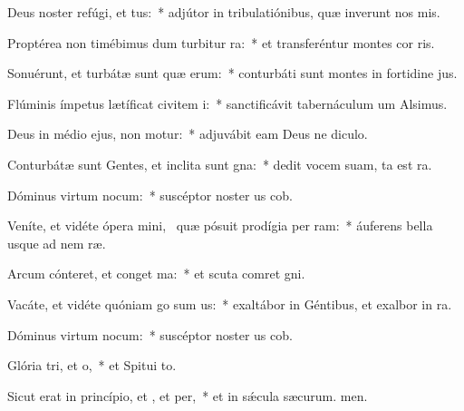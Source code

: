 \item Deus noster refúgi, et tus:~* adjútor in tribulatiónibus, quæ inverunt nos mis.
\item Proptérea non timébimus dum turbitur ra:~* et transferéntur montes  cor ris.
\item Sonuérunt, et turbátæ sunt quæ erum:~* conturbáti sunt montes in fortidine jus.
\item Flúminis ímpetus lætíficat civitem i:~* sanctificávit tabernáculum um Alsimus.
\item Deus in médio ejus, non motur:~* adjuvábit eam Deus ne diculo.
\item Conturbátæ sunt Gentes, et inclita sunt gna:~* dedit vocem suam, ta est ra.
\item Dóminus virtum nocum:~* suscéptor noster us cob.
\item Veníte, et vidéte ópera mini,~\pscross{} quæ pósuit prodígia per ram:~* áuferens bella usque ad nem ræ.
\item Arcum cónteret, et conget ma:~* et scuta comret gni.
\item Vacáte, et vidéte quóniam go sum us:~* exaltábor in Géntibus, et exalbor in ra.
\item Dóminus virtum nocum:~* suscéptor noster us cob.
\item Glória tri, et o,~* et Spitui to.
\item Sicut erat in princípio, et , et per,~* et in sǽcula sæcurum. men.
